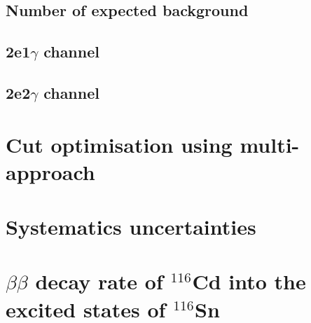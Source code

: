 \documentclass[main.tex]{subfiles}
\begin{document}
\subsection{Number of expected background}
\subsection{2e1$\gamma$ channel}
\subsection{2e2$\gamma$ channel}

\section{Cut optimisation using multi-approach}

\section{Systematics uncertainties}

\section{$\beta\beta$ decay rate of $^{\text{116}}$Cd into the excited states of $^{\text{116}}$Sn}
\end{document}
